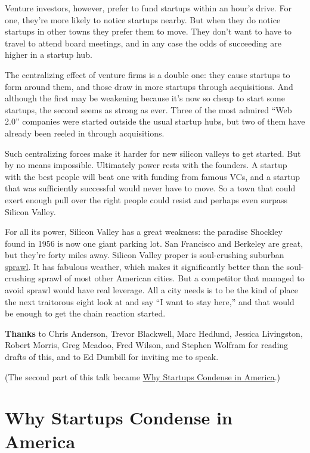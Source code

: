 \documentclass[12pt]{book}
\begin{document}
Venture investors, however, prefer to fund startups within an hour's
drive. For one, they're more likely to notice startups nearby. But when
they do notice startups in other towns they prefer them to move. They
don't want to have to travel to attend board meetings, and in any case
the odds of succeeding are higher in a startup hub.

The centralizing effect of venture firms is a double one: they cause
startups to form around them, and those draw in more startups through
acquisitions. And although the first may be weakening because it's now
so cheap to start some startups, the second seems as strong as ever.
Three of the most admired ``Web 2.0'' companies were started outside the
usual startup hubs, but two of them have already been reeled in through
acquisitions.

Such centralizing forces make it harder for new silicon valleys to get
started. But by no means impossible. Ultimately power rests with the
founders. A startup with the best people will beat one with funding from
famous VCs, and a startup that was sufficiently successful would never
have to move. So a town that could exert enough pull over the right
people could resist and perhaps even surpass Silicon Valley.

For all its power, Silicon Valley has a great weakness: the paradise
Shockley found in 1956 is now one giant parking lot. San Francisco and
Berkeley are great, but they're forty miles away. Silicon Valley proper
is soul-crushing suburban
\href{http://www.flickr.com/photos/caterina/34637/}{sprawl}. It has
fabulous weather, which makes it significantly better than the
soul-crushing sprawl of most other American cities. But a competitor
that managed to avoid sprawl would have real leverage. All a city needs
is to be the kind of place the next traitorous eight look at and say ``I
want to stay here,'' and that would be enough to get the chain reaction
started.


\textbf{Thanks} to Chris Anderson, Trevor Blackwell, Marc Hedlund,
Jessica Livingston, Robert Morris, Greg Mcadoo, Fred Wilson, and Stephen
Wolfram for reading drafts of this, and to Ed Dumbill for inviting me to
speak.

(The second part of this talk became \href{america.html}{Why Startups
Condense in America}.)
\chapter{Why Startups Condense in America}
\end{document}
